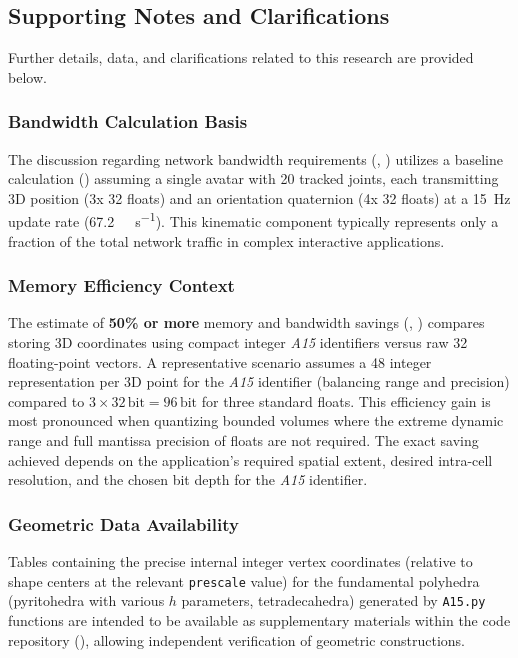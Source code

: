\documentclass[10pt]{article}
\def\AAAB{\textit{A15}}
\begin{document}
\subsection{Supporting Notes and Clarifications}\label{subsec-supplementary-notes}

Further details, data, and clarifications related to this research are provided below.

\subsubsection{Bandwidth Calculation Basis}\label{subsubsec-notes-bandwidth}
The discussion regarding network bandwidth requirements (, ) utilizes a baseline calculation () assuming a single avatar with 20 tracked joints, each transmitting 3D position (3x \SI{32}{\bit} floats) and an orientation quaternion (4x \SI{32}{\bit} floats) at a \SI{15}{\hertz} update rate (\approx \SI{67.2}{\kilo\bit\per\second}). This kinematic component typically represents only a fraction of the total network traffic in complex interactive applications.

\subsubsection{Memory Efficiency Context}\label{subsubsec-notes-memory}
The estimate of \textbf{50\% or more} memory and bandwidth savings (, ) compares storing 3D coordinates using compact integer \AAAB{} identifiers versus raw \SI{32}{\bit} floating-point vectors. A representative scenario assumes a \SI{48}{\bit} integer representation per 3D point for the \AAAB{} identifier (balancing range and precision) compared to $3 \times 32\,\text{bit} = 96\,\text{bit}$ for three standard floats. This efficiency gain is most pronounced when quantizing bounded volumes where the extreme dynamic range and full mantissa precision of floats are not required. The exact saving achieved depends on the application's required spatial extent, desired intra-cell resolution, and the chosen bit depth for the \AAAB{} identifier.

\subsubsection{Geometric Data Availability}\label{subsubsec-notes-geometry}
Tables containing the precise internal integer vertex coordinates (relative to shape centers at the relevant \texttt{prescale} value) for the fundamental polyhedra (pyritohedra with various $h$ parameters, tetradecahedra) generated by \texttt{A15.py} functions are intended to be available as supplementary materials within the code repository (), allowing independent verification of geometric constructions.
\end{document}
